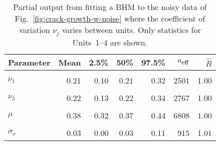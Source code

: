 \begin{table}
\centering
\caption{\label{tab:pp_nu}Partial output from fitting a BHM to the noisy data of Fig.~\ref{fig:crack-growth-w-noise} where the coefficient of variation $\nu_j$ varies between units. Only statistics for Units~1--4 are shown.}
\centering
\begin{tabular}[t]{lrrrrrr}
\toprule
Parameter & Mean & 2.5\% & 50\% & 97.5\% & $n_{\small{\mbox{eff}}}$ & $\hat{R}$\\
\midrule
\cellcolor{gray!10}{$\sigma$} & \cellcolor{gray!10}{0.03} & \cellcolor{gray!10}{0.02} & \cellcolor{gray!10}{0.03} & \cellcolor{gray!10}{0.04} & \cellcolor{gray!10}{6072} & \cellcolor{gray!10}{1.00}\\
$\nu_1$ & 0.21 & 0.10 & 0.21 & 0.32 & 2501 & 1.00\\
\cellcolor{gray!10}{$\nu_2$} & \cellcolor{gray!10}{0.22} & \cellcolor{gray!10}{0.14} & \cellcolor{gray!10}{0.22} & \cellcolor{gray!10}{0.34} & \cellcolor{gray!10}{3092} & \cellcolor{gray!10}{1.00}\\
$\nu_3$ & 0.22 & 0.13 & 0.22 & 0.34 & 2767 & 1.00\\
\cellcolor{gray!10}{$\nu_4$} & \cellcolor{gray!10}{0.22} & \cellcolor{gray!10}{0.13} & \cellcolor{gray!10}{0.22} & \cellcolor{gray!10}{0.34} & \cellcolor{gray!10}{2821} & \cellcolor{gray!10}{1.00}\\
\addlinespace
$\mu$ & 0.38 & 0.32 & 0.37 & 0.44 & 6808 & 1.00\\
\cellcolor{gray!10}{$\mu_\nu$} & \cellcolor{gray!10}{0.22} & \cellcolor{gray!10}{0.15} & \cellcolor{gray!10}{0.22} & \cellcolor{gray!10}{0.31} & \cellcolor{gray!10}{2127} & \cellcolor{gray!10}{1.00}\\
$\sigma_\nu$ & 0.03 & 0.00 & 0.03 & 0.11 & 915 & 1.01\\
\bottomrule
\end{tabular}
\end{table}

